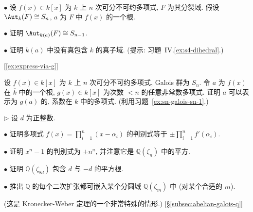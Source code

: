 \begin{prob}\label{ex:sn-galois-sn-1}
$\bullet$ 设 $f(x)\in k[x]$ 为 $k$ 上 $n$ 次可分不可约多项式, $F$ 为其分裂域. 假设 $\Aut_k(F)\cong S_n$, $a$ 为 $F$ 中 $f(x)$ 的一个根.

$\bullet$ 证明 $\Aut_{k(a)}(F)\cong S_{n-1}$.

$\bullet$ 证明 $k(a)$ 中没有真包含 $k$ 的真子域. (提示: 习题~IV.\ref{ex:s4-dihedral}.)

[\ref{ex:express-via-g}]
\end{prob}

\begin{prob}\label{ex:express-via-g}
设 $f(x)\in k[x]$ 为 $k$ 上 $n$ 次可分不可约多项式, Galois 群为 $S_n$. 令 $a$ 为 $f(x)$ 在 $\overline{k}$ 中的一个根, $g(x)\in k[x]$ 为次数 $<n$ 的任意非常数多项式. 证明 $a$ 可以表示为 $g(a)$ 的, 系数在 $k$ 中的多项式. (利用习题~\ref{ex:sn-galois-sn-1}.)
\end{prob}

\begin{prob}\label{ex:quadratic-in-cyclotomic}
$\triangleright$ 设 $d$ 为正整数.

$\bullet$ 证明多项式 $f(x)=\prod_{i=1}^n(x-\alpha_i)$ 的判别式等于 $\pm\prod_{i=1}^n f'(\alpha_i)$.

$\bullet$ 证明 $x^n-1$ 的判别式为 $\pm n^n$, 并注意它是 $\mathbb{Q}(\zeta_n)$ 中的平方.

$\bullet$ 证明 $\mathbb{Q}(\zeta_{8d})$ 包含 $d$ 与 $-d$ 的平方根.

$\bullet$ 推出 $\mathbb{Q}$ 的每个二次扩张都可嵌入某个分圆域 $\mathbb{Q}(\zeta_m)$ 中 (对某个合适的 $m$).

(这是 Kronecker-Weber 定理的一个非常特殊的情形.) [§\ref{subsec:abelian-galois-q}]
\end{prob}
